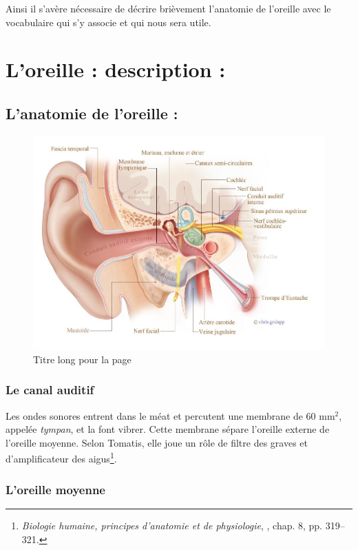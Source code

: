 Ainsi il s'avère nécessaire de décrire brièvement l'anatomie de l'oreille
avec le vocabulaire qui s'y associe et qui nous sera utile.

\section{L'oreille : description : }

\subsection{L'anatomie de l'oreille :}
\begin{figure}
	\centering
	\includegraphics[width=0.7\linewidth]{images/20160624Berufsfeldgruppen.jpg}
	\caption[Titre pour toc]{Titre long pour la page}
	\label{fig:-20160624berufsfeldgruppen}
\end{figure}

\subsubsection{Le canal auditif}

Les ondes sonores entrent dans le méat et percutent
une membrane de 60 mm$^2$, appelée \emph{tympan}, et la font vibrer. Cette membrane
sépare l'oreille externe de l'oreille moyenne. Selon Tomatis, elle
joue un rôle de filtre des graves et d'amplificateur des aigus\footnote{\textsl{Biologie humaine, principes d'anatomie et de physiologie}, \cite{marieb:biologie}, chap. 8, pp. 319--321.}.

\subsubsection{L'oreille moyenne}

